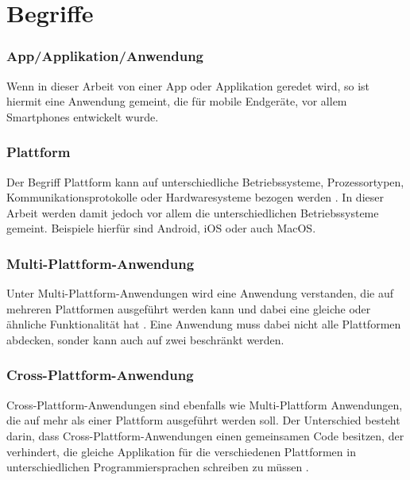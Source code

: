 \section{Begriffe}
\subsubsection{App/Applikation/Anwendung}
Wenn in dieser Arbeit von einer App oder Applikation geredet wird, so ist hiermit eine Anwendung gemeint, die für mobile Endgeräte, vor allem Smartphones entwickelt wurde.
\subsubsection{Plattform}
Der Begriff Plattform kann auf unterschiedliche Betriebssysteme, Prozessortypen, Kommunikationsprotokolle oder Hardwaresysteme bezogen werden \cite{2014Mulit_plattform_definition}. In dieser Arbeit werden damit jedoch vor allem die unterschiedlichen Betriebssysteme gemeint. Beispiele hierfür sind Android, iOS oder auch MacOS. 
\subsubsection{Multi-Plattform-Anwendung}
Unter Multi-Plattform-Anwendungen wird eine Anwendung verstanden, die auf mehreren Plattformen ausgeführt werden kann und dabei eine gleiche oder ähnliche Funktionalität hat \cite{2014Mulit_plattform_definition}. Eine Anwendung muss dabei nicht alle Plattformen abdecken, sonder kann auch auf zwei beschränkt werden.
\subsubsection{Cross-Plattform-Anwendung}
Cross-Plattform-Anwendungen sind ebenfalls wie Multi-Plattform Anwendungen, die auf mehr als einer Plattform ausgeführt werden soll. Der Unterschied besteht darin, dass Cross-Plattform-Anwendungen einen gemeinsamen Code besitzen, der verhindert, die gleiche Applikation für die verschiedenen Plattformen in unterschiedlichen Programmiersprachen schreiben zu müssen \cite{2014_Cross_plattform}.

